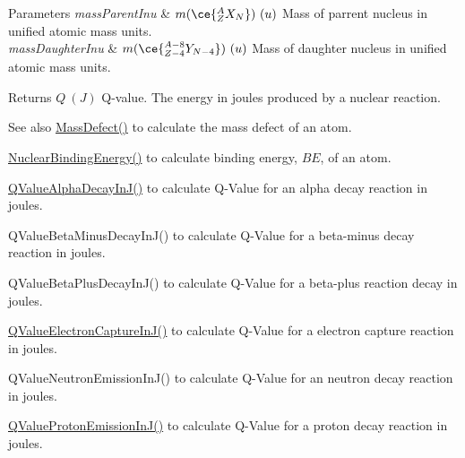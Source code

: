 \begin{DoxyParams}{Parameters}
{\em mass\+Parent\+Inu} & $m(\ce{ ^{A}_{Z}X_{N} })\ (u)$ Mass of parrent nucleus in unified atomic mass units. \\
\hline
{\em mass\+Daughter\+Inu} & $m(\ce{ ^{A-8}_{Z-4}Y_{N-4} })\ (u)$ Mass of daughter nucleus in unified atomic mass units. \\
\hline
\end{DoxyParams}
\begin{DoxyReturn}{Returns}
$Q\ (J)$ Q-\/value. The energy in joules produced by a nuclear reaction. 
\end{DoxyReturn}
\begin{DoxySeeAlso}{See also}
\mbox{\hyperlink{group___e_g_x_phys-_mass_defect_gae89f2dfa65992c0314adc2440b2f582a}{Mass\+Defect()}} to calculate the mass defect of an atom. 

\mbox{\hyperlink{group___e_g_x_phys-_nuclear_binding_energy_gab6832bf15ead7b4e867e759e0a2a078e}{Nuclear\+Binding\+Energy()}} to calculate binding energy, $BE$, of an atom. 

\mbox{\hyperlink{group___e_g_x_phys-_q_value-_alpha_gab8a50c18f6de3c1b6ed280c26c3ff3a5}{Q\+Value\+Alpha\+Decay\+In\+J()}} to calculate Q-\/\+Value for an alpha decay reaction in joules. 

Q\+Value\+Beta\+Minus\+Decay\+In\+J() to calculate Q-\/\+Value for a beta-\/minus decay reaction in joules. 

Q\+Value\+Beta\+Plus\+Decay\+In\+J() to calculate Q-\/\+Value for a beta-\/plus reaction decay in joules. 

\mbox{\hyperlink{group___e_g_x_phys-_q_value-_electron_capture_gaf2569f9c706130b730dcf55695780263}{Q\+Value\+Electron\+Capture\+In\+J()}} to calculate Q-\/\+Value for a electron capture reaction in joules. 

Q\+Value\+Neutron\+Emission\+In\+J() to calculate Q-\/\+Value for an neutron decay reaction in joules. 

\mbox{\hyperlink{group___e_g_x_phys-_q_value-_proton_ga41f19b0d9a2dc06e89de44aaa2d48d62}{Q\+Value\+Proton\+Emission\+In\+J()}} to calculate Q-\/\+Value for a proton decay reaction in joules. 
\end{DoxySeeAlso}
\mbox{\label{group___e_g_x_phys-_q_value-_alpha_ga85230c793adc7fc78fef760874f75ad9}} 
